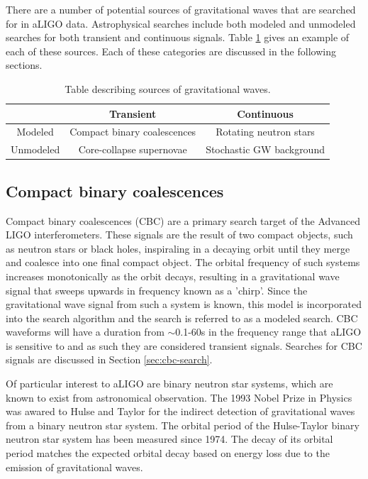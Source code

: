 There are a number of potential sources of gravitational waves that are 
searched for in aLIGO data. Astrophysical searches include both modeled and unmodeled 
searches for both transient and continuous signals. Table \ref{tab:sources} 
gives an example of each of these sources. Each of these categories are 
discussed in the following sections.

\begin{table}[!ht]%
  \begin{tabular}{|c|c|c|}
  \hline
    & Transient  & Continuous  \\
  \hline
  Modeled & Compact binary coalescences & Rotating neutron stars  \\
  \hline
  Unmodeled & Core-collapse supernovae & Stochastic GW background \\
  \hline
  \end{tabular}
  \caption[Table of GW sources]{Table describing sources of %
           gravitational waves.}
  \label{tab:sources}
\end{table}

\subsection{Compact binary coalescences}

Compact binary coalescences (CBC) are a primary search target of the 
Advanced LIGO interferometers. These signals are the result of two 
compact objects, such as neutron stars or black holes, inspiraling 
in a decaying orbit until they merge and coalesce into one final 
compact object. The orbital frequency of such systems increases 
monotonically as the orbit decays, resulting in a gravitational 
wave signal that sweeps upwards in frequency known as a 'chirp'. 
Since the gravitational wave signal from such a system is known, 
this model is incorporated into the search algorithm and the 
search is referred to as a modeled search. CBC waveforms will 
have a duration from $\sim$0.1-60s in the frequency range that
aLIGO is sensitive to and as such they are considered transient 
signals. Searches for CBC 
signals are discussed in Section \ref{sec:cbc-search}.

Of particular interest to aLIGO are binary neutron star systems, 
which are known to exist from astronomical 
observation. The 1993 Nobel Prize in Physics was awared to Hulse and 
Taylor for the indirect detection of gravitational waves from a binary 
neutron star system. The orbital 
period of the Hulse-Taylor binary neutron star system has been measured 
since 1974. The decay of its orbital period matches the 
expected orbital decay based on energy loss due to the emission of 
gravitational waves. 

